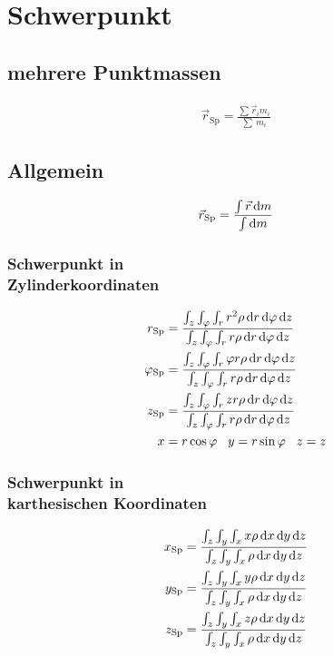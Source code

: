 \section{Schwerpunkt}

\begin{multicols}{2}{}
\subsection*{mehrere Punktmassen}
\begin{align*}
\vec{r}_{\text{Sp}}=\frac{\sum\vec{r}_i m_i}{\sum\ m_i}
\end{align*}


\subsection*{Allgemein}
\begin{align*}
\vec{r}_{\text{Sp}}=\frac{\int \vec{r}\mathop{}\!\mathrm{d} m}{\int \mathop{}\!\mathrm{d} m}
\end{align*}
\end{multicols}

\begin{multicols}{2}{}
\subsubsection*{Schwerpunkt in \\Zylinderkoordinaten}
\begin{align*}
r_{\text{Sp}}&=\frac{\int_z\int_\varphi\int_r r^2\rho \diff r \diff \varphi \diff z }{\int_z\int_\varphi\int_r r\rho \diff r \diff \varphi \diff z }\\
\varphi_{\text{Sp}}&=\frac{\int_z\int_\varphi\int_r \varphi r\rho \diff r \diff \varphi \diff z }{\int_z\int_\varphi\int_r r\rho \diff r \diff \varphi \diff z }\\
z_{\text{Sp}}&=\frac{\int_z\int_\varphi\int_r z r\rho \diff r \diff \varphi \diff z }{\int_z\int_\varphi\int_r r\rho \diff r \diff \varphi \diff z }\\
x&=r\cos{\varphi}\hspace{3mm}y=r\sin{\varphi}\hspace{3mm}z=z
\end{align*}

\subsubsection*{Schwerpunkt in \\karthesischen Koordinaten}
\begin{align*}
x_{\text{Sp}}&=\frac{\int_z\int_y\int_x x\rho \diff x \diff y \diff z }{\int_z\int_y\int_x \rho \diff x \diff y \diff z }\\
y_{\text{Sp}}&=\frac{\int_z\int_y\int_x y\rho \diff x \diff y \diff z }{\int_z\int_y\int_x \rho \diff x \diff y \diff z }\\
z_{\text{Sp}}&=\frac{\int_z\int_y\int_x z\rho \diff x \diff y \diff z }{\int_z\int_y\int_x \rho \diff x \diff y \diff z }
\end{align*}
\hfill
\end{multicols}


